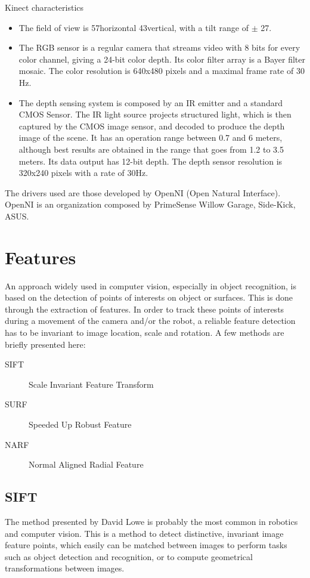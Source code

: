 Kinect characteristics
\begin{itemize}
\item The field of view is 57\textdegree horizontal 43\textdegree vertical, with a tilt range of $\pm$ 27\textdegree.
\item The RGB sensor is a regular camera that streams video with 8 bits for every color channel, giving a 24-bit color depth. Its color filter array is a Bayer filter mosaic. The color resolution is 640x480 pixels and a maximal frame rate of 30 Hz.
\item The depth sensing system is composed by an IR emitter and a standard CMOS Sensor. The IR light source projects structured light, which is then captured by the CMOS image sensor, and decoded to produce the depth image of the scene. It has an operation range between 0.7 and 6 meters, although best results are obtained in the range that goes from 1.2 to 3.5 meters. Its data output has 12-bit depth. The depth sensor resolution is 320x240 pixels with a rate of 30Hz.
\end{itemize}

The drivers used are those developed by OpenNI (Open Natural Interface). OpenNI is an organization composed by PrimeSense Willow Garage, Side-Kick, ASUS.


\section{Features}

An approach widely used in computer vision, especially in object recognition, is based on the detection of points of interests on object or surfaces. This is done through the extraction of features. In order to track these points of interests during a movement of the camera and/or the robot, a reliable feature detection has to be invariant to image location, scale and rotation. A few methods are briefly presented here:
\begin{description}
\item[SIFT] Scale Invariant Feature Transform
\item[SURF] Speeded Up Robust Feature
\item[NARF] Normal Aligned Radial Feature
\end{description}

\subsection{SIFT}
The method presented by David Lowe \cite{lowesift} is probably the most common in robotics and computer vision.
This is a method to detect distinctive, invariant image feature points, which easily can be matched between images to perform tasks such as object detection and recognition, or to compute geometrical transformations between images.

